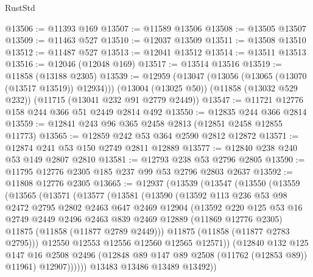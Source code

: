 \begin{lexlean}{RustStd}
\begin{coremodule}
@13506 := @11393 @169
@13507 := @11589 @13506
@13508 := @13505 @13507
@13509 := @11463 @527
@13510 := @12037 @13509
@13511 := @13508 @13510
@13512 := @11487 @527
@13513 := @12041 @13512
@13514 := @13511 @13513
@13516 := @12046 (@12048 @169)
@13517 := @13514 @13516
@13519 := @11858 (@13188 @2305)
@13539 := @12959
    (@13047 (@13056 (@13065 (@13070 (@13517 @13519)) @12934)))
    (@13004 (@13025 @50))
    (@11858 (@13032 @529 @232))
    (@11715 (@13041 @232 @91 @2779 @2449))
@13547 := @11721 @12776 @158 @244 @366 @51 @2449 @2814 @492
@13550 := @12835 @244 @366 @2814
@13559 := @12841 @243 @96 @365 @2458 @2813 (@12851 @2458 @12855 @11773)
@13565 := @12859 @242 @53 @364 @2590 @2812 @12872
@13571 := @12874 @241 @53 @150 @2749 @2811 @12889
@13577 := @12840 @238 @240 @53 @149 @2807 @2810
@13581 := @12793 @238 @53 @2796 @2805
@13590 := @11795 @12776 @2305 @185 @237 @99 @53 @2796 @2803 @2637
@13592 := @11808 @12776 @2305
@13665 := @12937
    (@13539
      (@13547
        (@13550
          (@13559
            (@13565
              (@13571
                (@13577
                  (@13581
                    (@13590
                      (@13592
                        @113
                        @236
                        @53
                        @98
                        @2472
                        @2795
                        @2802
                        @2463
                        @647
                        @2469
                        @12904
                        (@13592
                          @220
                          @125
                          @53
                          @16
                          @2749
                          @2449
                          @2496
                          @2463
                          @839
                          @2469
                          @12889
                          (@11869 @12776 @2305)
                          @11875
                          (@11858 (@11877 @2789 @2449)))
                        @11875
                        (@11858 (@11877 @2783 @2795)))
                      @12550
                      @12553
                      @12556
                      @12560
                      @12565
                      @12571))
                  (@12840
                    @132
                    @125
                    @147
                    @16
                    @2508
                    @2496
                    (@12848 @89 @147 @89 @2508 (@11762 (@12853 @89)) @11961)
                    @12907))))))
        @13483
        @13486
        @13489
        @13492))

\end{coremodule}
\end{lexlean}
